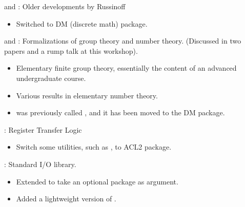 
\begin{frame}

\implibtitle

 and :
Older developments by Russinoff
\begin{itemize}
\item Switched to DM (discrete math) package.
\end{itemize}

\end{frame}


\begin{frame}

\implibtitle

 and :
Formalizations of group theory and number theory.
(Discussed in two papers and a rump talk at this workshop).
\begin{itemize}
\item Elementary finite group theory,
  essentially the content of an advanced undergraduate course.
\item Various results in elementary number theory.
\item {} was previously called
  , and it has been moved to the DM
  package.
\end{itemize}

\end{frame}


\begin{frame}

\implibtitle

:
Register Transfer Logic
\begin{itemize}
\item Switch some utilities, such as , to ACL2 package.
\end{itemize}

\end{frame}


\begin{frame}

\implibtitle

:
Standard I/O library.
\begin{itemize}
\item Extended 
  to take an optional package as argument.
\item Added a lightweight version of .
\end{itemize}

\end{frame}

